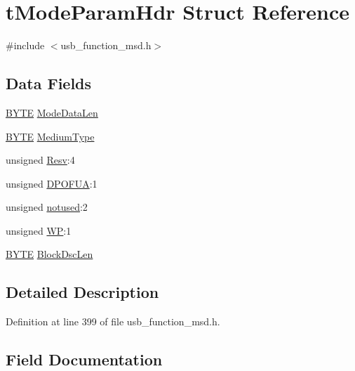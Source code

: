 \hypertarget{structt_mode_param_hdr}{}\section{t\+Mode\+Param\+Hdr Struct Reference}
\label{structt_mode_param_hdr}


{\ttfamily \#include $<$usb\+\_\+function\+\_\+msd.\+h$>$}

\subsection*{Data Fields}
\begin{DoxyCompactItemize}
\item 
\hyperlink{_generic_type_defs_8h_a4ae1dab0fb4b072a66584546209e7d58}{B\+Y\+T\+E} \hyperlink{structt_mode_param_hdr_a7b658fec073f717fe927dd42f7879d77}{Mode\+Data\+Len}
\item 
\hyperlink{_generic_type_defs_8h_a4ae1dab0fb4b072a66584546209e7d58}{B\+Y\+T\+E} \hyperlink{structt_mode_param_hdr_a64e8adf5ffc6c60ac18b418c33eefac8}{Medium\+Type}
\item 
unsigned \hyperlink{structt_mode_param_hdr_a210ae04a3873a61568ab9e3a6595b20f}{Resv}\+:4
\item 
unsigned \hyperlink{structt_mode_param_hdr_a1f787a59551188f4302d096856a3e672}{D\+P\+O\+F\+U\+A}\+:1
\item 
unsigned \hyperlink{structt_mode_param_hdr_af096e8912c28affc9fddd1e352670b45}{notused}\+:2
\item 
unsigned \hyperlink{structt_mode_param_hdr_a8d2d25abedbe6cfe0f382c34cf387aa0}{W\+P}\+:1
\item 
\hyperlink{_generic_type_defs_8h_a4ae1dab0fb4b072a66584546209e7d58}{B\+Y\+T\+E} \hyperlink{structt_mode_param_hdr_a55db6651f8b8fe6d340edd391421731c}{Block\+Dsc\+Len}
\end{DoxyCompactItemize}


\subsection{Detailed Description}


Definition at line 399 of file usb\+\_\+function\+\_\+msd.\+h.



\subsection{Field Documentation}
\hypertarget{structt_mode_param_hdr_a55db6651f8b8fe6d340edd391421731c}{}
